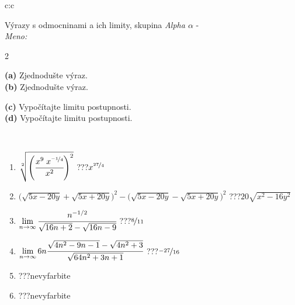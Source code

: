 \documentclass[10pt]{report}
\begin{document}
\thispagestyle{empty}
\begin{tabular}{c:c}
\begin{minipage}[c][104.5mm][t]{0.5\linewidth}
\begin{center}
\vspace{7mm}
{\huge {\Large Výrazy s odmocninami a ich limity}, skupina \textit{Alpha $\alpha$} -}\\[5mm]
\textit{Meno:}\phantom{xxxxxxxxxxxxxxxxxxxxxxxxxxxxxxxxxxxxxxxxxxxxxxxxxxxxxxxxxxxxxxxxx}\\[5mm]
\begin{minipage}{0.95\linewidth}
\begin{center}
{\small \begin{multicols}{2} \raggedright
\phantom{xxxxxxxxx}\textbf{(a)} Zjednodušte výraz. \\[1mm]
\phantom{xxxxxxxxx}\textbf{(b)} Zjednodušte výraz. \par \columnbreak
\textbf{(c)} Vypočítajte limitu postupnosti. \\[1mm]
\textbf{(d)} Vypočítajte limitu postupnosti.
\end{multicols}
}
\end{center}
\end{minipage}
\\[4mm]
\begin{minipage}{0.79\linewidth}
\begin{center}
\begin{varwidth}{\linewidth}
\begin{enumerate}
\small
\item $\sqrt[2]{\left(\cfrac{x^{9}\;x^{\nicefrac{-1}{4}}}{x^{2}}\right)^{2}}$\quad \dotfill\; ???\;\dotfill \quad $x^{\nicefrac{27}{4}}$
\item {\footnotesize{\scriptsize$\big(\sqrt{5x-20y}+\sqrt{5x+20y}\big)^2-\big(\sqrt{5x-20y}-\sqrt{5x+20y}\big)^2$}\quad \dotfill\; ???\;\dotfill \quad $20\sqrt{x^2-16y^2}$}
\item $\lim\limits_{n\to\infty}\cfrac{n^{-1/2}}{\sqrt{16n+2}-\sqrt{16n-9}}$\quad \dotfill\; ???\;\dotfill \quad $\nicefrac{8}{11}$
\item $\lim\limits_{n\to\infty}6n\cfrac{\sqrt{4n^2-9n-1}-\sqrt{4n^2+3}}{\sqrt{64n^2+3n+1}}$\quad \dotfill\; ???\;\dotfill \quad $\nicefrac{-27}{16}$
\item \quad \dotfill\; ???\;\dotfill \quad nevyfarbite
\item \quad \dotfill\; ???\;\dotfill \quad nevyfarbite
\end{enumerate}
\end{varwidth}

\end{center}
\end{minipage}
\end{center}
\end{minipage}
\end{tabular}
\end{document}
